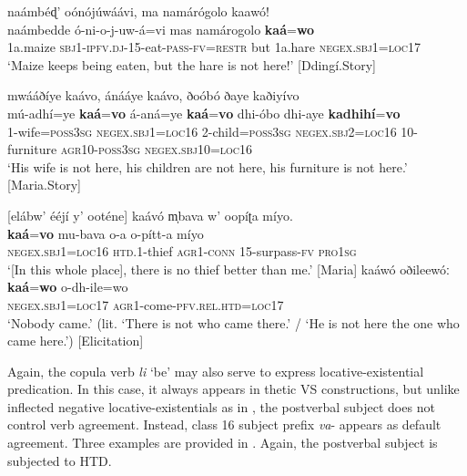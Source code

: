 \documentclass[output=paper,colorlinks=true, citecolor=brown,draftmode]{langscibook}
\begin{document}
{\ea\label{ex:cuw:28}
    \ea\label{ex:cuw:28a} naámbéɖ’ oónójúwáávi, ma namárógolo kaawó!\\
        \gll  naámbedde ó-ni-o-j-uw-á=vi mas namárogolo \textbf{kaá}=\textbf{wo} \\
             1a.maize \textsc{sbj1}-\textsc{ipfv.dj-15}{}-eat-\textsc{pass}{}-\textsc{fv=restr} but 1a.hare \textsc{negex.sbj1=loc17}  \\
        \glt ‘Maize keeps being eaten, but the hare is not here!’ [Ddingí.Story]

    \ex\label{ex:cuw:28b} mwááðíye kaávo, ánááye kaávo, ðoóbó ðaye kaðiyívo\\
        \gll  mú-adhí=ye \textbf{kaá}=\textbf{vo} á-aná=ye \textbf{kaá}=\textbf{vo} dhi-óbo dhi-aye \textbf{kadhihí}=\textbf{vo}  \\
             1-wife=\textsc{poss3sg} \textsc{negex.sbj1}=\textsc{loc16} 2-child=\textsc{poss3sg} \textsc{negex.sbj2}=\textsc{loc16} 10-furniture \textsc{agr}10-\textsc{poss3sg} \textsc{negex.sbj1}0=\textsc{loc16}  \\
        \glt ‘His wife is not here, his children are not here, his furniture is not here.’ [Maria.Story]
    \z
\z }

{\ea\label{ex:cuw:29}
    \ea\label{ex:cuw:29a} [elábw’ ééjí y’ ooténe] kaávó m̩bava w’ oopíʈa míyo. \\ 
        \gll  \textbf{kaá}=\textbf{vo} mu-bava o-a o-pítt-a míyo \\
              \textsc{negex.sbj1}=\textsc{loc16} \textsc{htd.1}{}-thief \textsc{agr}1-\textsc{conn} \textsc{15}{}-surpass\textsc{{}-fv} \textsc{pro1sg} \\
        \glt ‘[In this whole place], there is no thief better than me.’ [Maria]
    \ex\label{ex:cuw:29b} kaáwó oðileewóː \\
        \gll  \textbf{kaá}=\textbf{wo} o-dh-ile=wo\\
                \textsc{negex.sbj1}=\textsc{loc17} \textsc{agr}1-come-\textsc{pfv.rel.htd}=\textsc{loc17}\\
        \glt ‘Nobody came.’ (lit. ‘There is not who came there.’ / ‘He is not here the one who came here.’) [Elicitation] 
    \z
\z }

Again, the copula verb \textit{li} ‘be’ may also serve to express locative-existential predication. In this case, it always appears in thetic VS constructions, but unlike inflected negative locative-existentials as in , the postverbal subject does not control verb agreement. Instead, class 16 subject prefix \textit{va}{}- appears as default agreement. Three examples are provided in . Again, the postverbal subject is subjected to HTD. 
\end{document}
